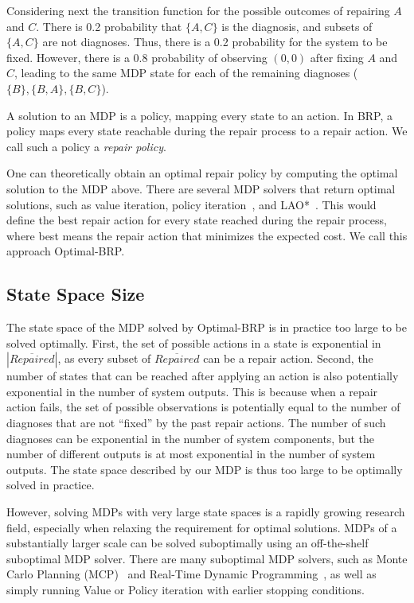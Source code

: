 Considering next the transition function for the possible outcomes of repairing $A$ and $C$. There is 0.2 probability that $\{A,C\}$ is the diagnosis, and subsets of $\{A,C\}$ are not diagnoses. Thus, there is a 0.2 probability for the system to be fixed. However, there is a 0.8 probability of observing $(0,0)$ after fixing $A$ and $C$, leading to the same MDP state for each of the remaining diagnoses  ($\{B\},\{B,A\},\{B,C\}$).


A solution to an MDP is a policy, mapping every state to an action. In BRP, a policy maps every state reachable during the repair process to a repair action. We call such a policy a {\em repair policy}.

One can theoretically obtain an optimal repair policy by computing the optimal solution to the MDP above. There are several MDP solvers that return optimal solutions, such as value iteration, policy iteration~\cite{russell2010artificialIntelligence}, and LAO*~\cite{hansen2001lao}.
This would define the best repair action for every state reached during the repair process, where best means the repair action that minimizes the expected cost. We call this approach Optimal-BRP.

\subsection{State Space Size}
The state space of the MDP solved by Optimal-BRP is in practice too large to be solved optimally. First, the set of possible actions in a state is exponential in $|\overline{Repaired}|$, as every subset of $\overline{Repaired}$ can be a repair action. %
Second, the number of states that can be reached after applying an action is also potentially exponential in the number of system outputs. This is because when a repair action fails, the set of possible observations is potentially equal to the number of diagnoses that are not ``fixed'' by the past repair actions. The number of such diagnoses can be exponential in the number of system components, but the number of different outputs is at most exponential in the number of system outputs.
The state space described by our MDP is thus too large to be optimally solved in practice.


However, solving MDPs with very large state spaces is a rapidly growing research field, especially when relaxing the requirement for optimal solutions. MDPs of a substantially larger scale can be solved suboptimally using an off-the-shelf suboptimal MDP solver. There are many suboptimal MDP solvers, such as Monte Carlo Planning (MCP)~\cite{silver2010monte} and Real-Time Dynamic Programming~\cite{barto1995learning}, as well as simply running Value or Policy iteration with earlier stopping conditions.